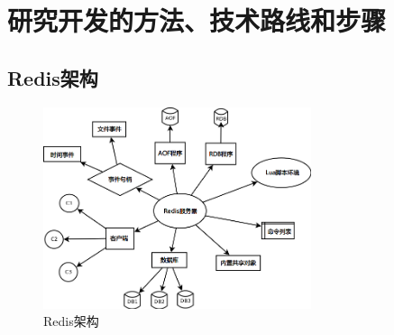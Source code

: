 \documentclass[proposal]{zjutreport}
\begin{document}
\newpage

\chapter{研究开发的方法、技术路线和步骤}
\section{Redis架构}
\begin{figure}[htbp]
\centering
\includegraphics[width=0.7\textwidth]{redis-server}
\caption{Redis架构}\label{fig:redis-server}
\vspace{\baselineskip}
\end{figure}
\end{document}
